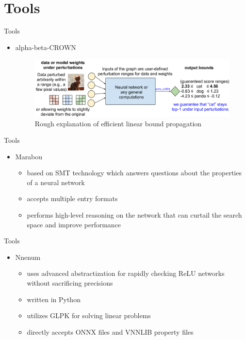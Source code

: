 \documentclass[9pt]{beamer}
\begin{document}
\section{Tools}
\begin{frame}[plain,c]{Tools}
\begin{itemize}
    \item alpha-beta-CROWN
    \begin{figure}[h]
    \centering
    \includegraphics[scale=0.17]{figure4.png}
    \caption{Rough explanation of efficient linear bound propagation}
    \end{figure}
\end{itemize}
\end{frame}
\begin{frame}[plain,c]{Tools}
\begin{itemize}
    \item Marabou
    \begin{itemize}
        \item based on SMT technology which answers questions about the properties of a neural network
        \item accepts multiple entry formats
        \item performs high-level reasoning on the network that can curtail the search space and improve performance
    \end{itemize}
\end{itemize}
\end{frame}
\begin{frame}[plain,c]{Tools}
\begin{itemize}
    \item Nnenum
    \begin{itemize}
        \item uses advanced abstractization for rapidly checking ReLU networks without sacrificing precisions
        \item written in Python
        \item utilizes GLPK for solving linear problems
        \item directly accepts ONNX files and VNNLIB property files
    \end{itemize}
\end{itemize}
\end{frame}
\end{document}
